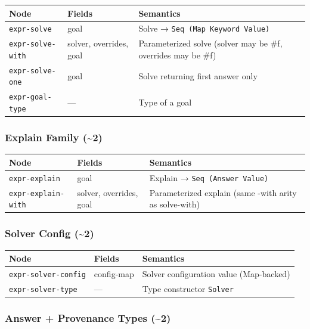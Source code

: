 \documentclass[11pt]{article}
\begin{document}
\begin{center}
\begin{tabular}{lll}
Node & Fields & Semantics\\
\hline
\texttt{expr-solve} & goal & Solve → \texttt{Seq (Map Keyword Value)}\\
\texttt{expr-solve-with} & solver, overrides, goal & Parameterized solve (solver may be \#f, overrides may be \#f)\\
\texttt{expr-solve-one} & goal & Solve returning first answer only\\
\texttt{expr-goal-type} & — & Type of a goal\\
\end{tabular}
\end{center}
\subsubsection{Explain Family (\textasciitilde{}2)}
\label{sec:org1cb8282}

\begin{center}
\begin{tabular}{lll}
Node & Fields & Semantics\\
\hline
\texttt{expr-explain} & goal & Explain → \texttt{Seq (Answer Value)}\\
\texttt{expr-explain-with} & solver, overrides, goal & Parameterized explain (same -with arity as solve-with)\\
\end{tabular}
\end{center}
\subsubsection{Solver Config (\textasciitilde{}2)}
\label{sec:org4cb8efd}

\begin{center}
\begin{tabular}{lll}
Node & Fields & Semantics\\
\hline
\texttt{expr-solver-config} & config-map & Solver configuration value (Map-backed)\\
\texttt{expr-solver-type} & — & Type constructor \texttt{Solver}\\
\end{tabular}
\end{center}
\subsubsection{Answer + Provenance Types (\textasciitilde{}2)}
\label{sec:org1bbb059}
\end{document}
